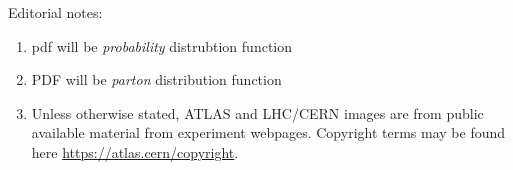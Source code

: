 Editorial notes: 
\begin{enumerate}
\item pdf will be \emph{probability} distrubtion function
\item PDF will be \emph{parton} distribution function
\item Unless otherwise stated, ATLAS and LHC/CERN images are from public available material from experiment webpages.  Copyright terms may be found here \url{https://atlas.cern/copyright}.
\end{enumerate}
